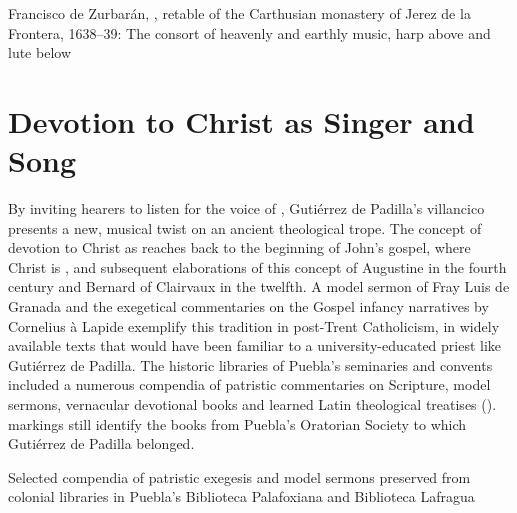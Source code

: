 
{Francisco de Zurbarán, , retable of the
Carthusian monastery of Jerez de la Frontera, 1638--39: The consort of heavenly
and earthly music, harp above and lute below}

\section{Devotion to Christ as Singer and Song}

By inviting hearers to listen for the voice of ,
Gutiérrez de Padilla's villancico presents a new, musical twist on an ancient
theological trope.
The concept of devotion to Christ as  reaches back to
the beginning of John's gospel, where Christ is ,
and subsequent elaborations of this concept of Augustine in the fourth century
and Bernard of Clairvaux in the twelfth.
A model sermon of Fray Luis de Granada and the exegetical commentaries on the
Gospel infancy narratives by Cornelius à Lapide exemplify this tradition in
post-Trent Catholicism, in widely available texts that would have been familiar
to a university-educated priest like Gutiérrez de Padilla.
The historic libraries of Puebla's seminaries and convents included a numerous
compendia of patristic commentaries on Scripture, model sermons, vernacular
devotional books and learned Latin theological treatises
().
 markings still identify the books from Puebla's 
Oratorian Society to which Gutiérrez de Padilla belonged.%
    \Autocite{Mauleon:PadillaCivil}


{Selected compendia of patristic exegesis and model sermons preserved from
colonial libraries in Puebla's Biblioteca Palafoxiana and Biblioteca Lafragua}

